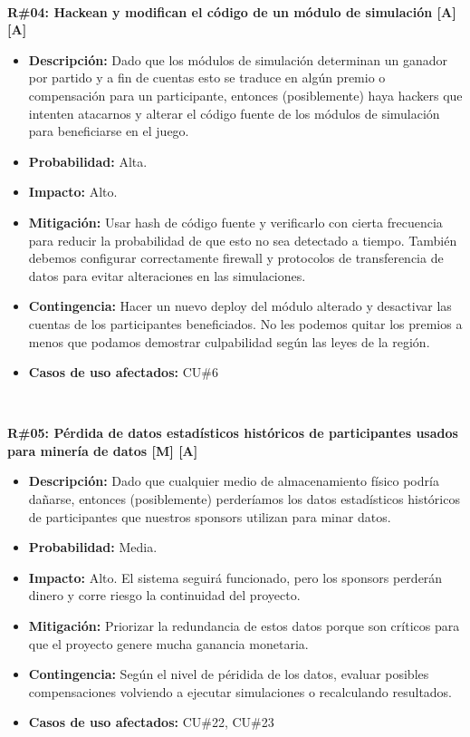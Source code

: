 ~

\noindent\textbf{R\#04: Hackean y modifican el código de un módulo de simulación [A] [A] } 
\begin{itemize}
	\item{\textbf{Descripción:} Dado que los módulos de simulación determinan un ganador por partido y a fin de cuentas esto se traduce en algún premio o compensación para un participante, entonces (posiblemente) haya hackers que intenten atacarnos y alterar el código fuente de los módulos de simulación para beneficiarse en el juego.}
	\item{\textbf{Probabilidad:} Alta.}
	\item{\textbf{Impacto:} Alto.}
	\item{\textbf{Mitigación:} Usar hash de código fuente y verificarlo con cierta frecuencia para reducir la probabilidad de que esto no sea detectado a tiempo. También debemos configurar correctamente firewall y protocolos de transferencia de datos para evitar alteraciones en las simulaciones.}
	\item{\textbf{Contingencia:} Hacer un nuevo deploy del módulo alterado y desactivar las cuentas de los participantes beneficiados. No les podemos quitar los premios a menos que podamos demostrar culpabilidad según las leyes de la región.}
	\item{\textbf{Casos de uso afectados:} CU\#6}
\end{itemize}

~

\noindent\textbf{R\#05: Pérdida de datos estadísticos históricos de participantes usados para minería de datos [M] [A] } 
\begin{itemize}
	\item{\textbf{Descripción:} Dado que cualquier medio de almacenamiento físico podría dañarse, entonces (posiblemente) perderíamos los datos estadísticos históricos de participantes que nuestros sponsors utilizan para minar datos.}
	\item{\textbf{Probabilidad:} Media.}
	\item{\textbf{Impacto:} Alto. El sistema seguirá funcionado, pero los sponsors perderán dinero y corre riesgo la continuidad del proyecto.}
	\item{\textbf{Mitigación:} Priorizar la redundancia de estos datos porque son críticos para que el proyecto genere mucha ganancia monetaria.}
	\item{\textbf{Contingencia:} Según el nivel de péridida de los datos, evaluar posibles compensaciones volviendo a ejecutar simulaciones o recalculando resultados.}
	\item{\textbf{Casos de uso afectados:} CU\#22, CU\#23}
\end{itemize}


